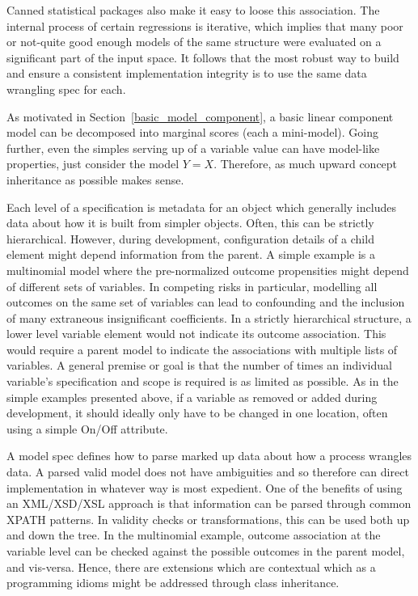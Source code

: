 \documentclass[10pt]{article}
\begin{document}
Canned statistical packages also make it easy to loose this association.  The internal process of certain regressions is iterative, which 
implies that many poor or not-quite good enough models of the same structure were evaluated on a significant part of the input space.
It follows that the most robust way to build and ensure a consistent implementation integrity is to use the same data wrangling spec
for each.

As motivated in Section~\ref{basic_model_component},  a basic linear component model can be decomposed into marginal scores (each
a mini-model). Going further, even the simples serving up of a variable value can have model-like properties, just consider the model $Y=X$.
Therefore, as much upward concept inheritance as possible makes sense.

Each level of a specification is metadata for an object which generally includes data about
how it is built from simpler objects.  Often, this can be strictly hierarchical.  
However, during development, configuration details of a child element might depend information from the parent.  A simple example is a
multinomial model where the pre-normalized outcome propensities might depend of different sets of variables.  In competing risks in
particular, modelling all outcomes on the same set of variables can lead to confounding and the inclusion of many extraneous insignificant
coefficients.  In a strictly hierarchical structure, a lower level variable element would not indicate its outcome association.  This would
require a parent model to indicate the associations with multiple lists of variables.  A general premise or goal is that the number of times
an individual variable's specification and scope is required is as limited as possible.   As in the simple examples presented above, if a
variable as removed or added during development, it should ideally only have to be changed in one location, often using a simple On/Off
attribute.  

A model spec defines how to parse marked up data about how a process wrangles data.  
A parsed valid model does not have ambiguities and so therefore can direct
implementation in whatever way is most expedient.  One of the benefits of using an XML/XSD/XSL approach is that information can be parsed
through common XPATH patterns.  In validity checks or transformations, this can be used both up and down the tree.  In the multinomial
example, outcome association at the variable level can be checked against the possible outcomes in the parent model, and vis-versa.  Hence,
there are extensions which are contextual which  as a programming idioms might be addressed through class inheritance.
\end{document}
